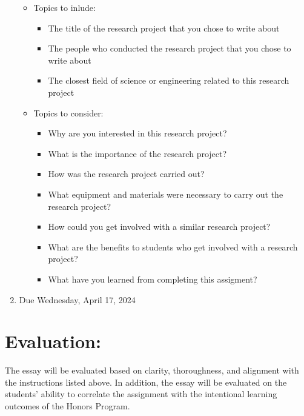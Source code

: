 \documentclass[12pt, letterpaper]{article}
\begin{document}
\begin{enumerate}
\begin{itemize}
\begin{minipage}[r]{0.2\linewidth}
        \end{minipage}
      \item Topics to inlude:
        \begin{itemize}
          \item The title of the research project that you chose to write about
          \item The people who conducted the research project that you chose to write about
          \item The closest field of science or engineering related to this research project
        \end{itemize}
      \item Topics to consider:
        \begin{itemize}
          \item Why are you interested in this research project?
          \item What is the importance of the research project?
          \item How was the research project carried out?
          \item What equipment and materials were necessary to carry out the research project?
          \item How could you get involved with a similar research project?
          \item What are the benefits to students who get involved with a research project?
          \item What have you learned from completing this assigment?
        \end{itemize}
    \end{itemize}
  \item Due Wednesday, April 17, 2024
\end{enumerate}
\section*{Evaluation:}
The essay will be evaluated based on clarity, thoroughness, and alignment with the instructions listed above. In addition, the essay will be evaluated on the students' ability to correlate the assignment with the intentional learning outcomes of the Honors Program. 
\end{document}
